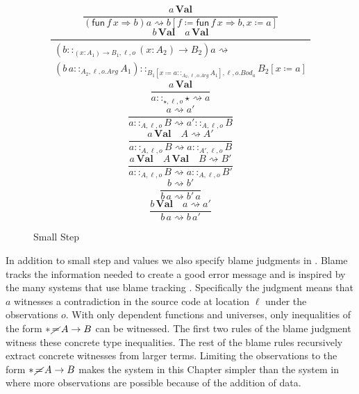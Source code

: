 \begin{figure}
\[
\frac{a\,\textbf{Val}}{\left(\mathsf{fun}\,f\,x\Rightarrow b\right)a\rightsquigarrow b\left[f\coloneqq\mathsf{fun}\,f\,x\Rightarrow b,x\coloneqq a\right]}
\]
\[
\frac{b\,\textbf{Val}\quad a\,\textbf{Val}}{\begin{array}{c}
\left(b::_{\left(x:A_{1}\right)\rightarrow B_{1},\ell ,o}\left(x:A_{2}\right)\rightarrow B_{2}\right)a\rightsquigarrow\\
\left(b\,a::_{A_{2},\ell,o.Arg}A_{1}\right)::_{B_{1}\left[x\coloneqq a::_{A_{2},\ell,o.Arg}A_{1}\right],\ell ,o.Bod_a}B_{2}\left[x\coloneqq a\right]
\end{array}}
\]
\[
\frac{a\,\textbf{Val}}{a::_{\star,\ell ,o}\star\rightsquigarrow a}
\]
\[
\frac{a\rightsquigarrow a'}{a::_{A,\ell ,o}B\rightsquigarrow a'::_{A,\ell ,o}B}
\]
\[
\frac{a\,\textbf{Val}\quad A\rightsquigarrow A'}{a::_{A,\ell ,o}B\rightsquigarrow a::_{A',\ell ,o}B}
\]
\[
\frac{a\,\textbf{Val}\quad A\,\textbf{Val}\quad B\rightsquigarrow B'}{a::_{A,\ell ,o}B\rightsquigarrow a::_{A,\ell ,o}B'}
\]
\[
\frac{b\rightsquigarrow b'}{b\,a\rightsquigarrow b'\,a}
\]
\[
\frac{b\,\textbf{Val}\quad a\rightsquigarrow a'}{b\,a\rightsquigarrow b\,a'}
\]
 
\caption{\CLang{} Small Step}
\label{fig:cast-step}
\end{figure}
 
In addition to small step and values we also specify blame judgments in .
Blame tracks the information needed to create a good error message and is inspired by the many systems that use blame tracking \cite{10.1145/581478.581484,10.1007/978-3-642-00590-9_1,wadler:LIPIcs:2015:5033}.
Specifically the judgment  means that $a$ witnesses a contradiction in the source code at location $\ell$ under the observations $o$.
With only dependent functions and universes, only inequalities of the form $*\,\cancel{=}\,A\rightarrow B$ can be witnessed.
The first two rules of the blame judgment witness these concrete type inequalities.
The rest of the blame rules recursively extract concrete witnesses from larger terms.
Limiting the observations to the form $*\,\cancel{=}\,A\rightarrow B$ makes the system in this Chapter simpler than the system in  where more observations are possible because of the addition of data.
 
